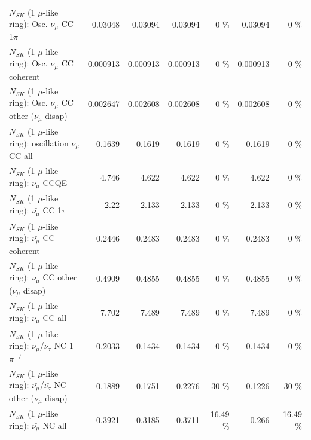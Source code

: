 \begin{table}
\begin{tabular}{| l | r | r | r  r | r  r |}
                          $N_{SK}$ (1 $\mu$-like ring): Osc. $\nu_\mu$ CC 1$\pi$ &         0.03048 &         0.03094 &         0.03094 &        0 \%  &         0.03094 &        0 \%  \\ 
                        $N_{SK}$ (1 $\mu$-like ring): Osc. $\nu_\mu$ CC coherent &        0.000913 &        0.000913 &        0.000913 &        0 \%  &        0.000913 &        0 \%  \\ 
         $N_{SK}$ (1 $\mu$-like ring): Osc. $\nu_\mu$ CC other ($\nu_\mu$ disap) &        0.002647 &        0.002608 &        0.002608 &        0 \%  &        0.002608 &        0 \%  \\ 
                      $N_{SK}$ (1 $\mu$-like ring): oscillation $\nu_\mu$ CC all &          0.1639 &          0.1619 &          0.1619 &        0 \%  &          0.1619 &        0 \%  \\ 
\hline
\hline
                              $N_{SK}$ (1 $\mu$-like ring): $\bar{\nu_\mu}$ CCQE &           4.746 &           4.622 &           4.622 &        0 \%  &           4.622 &        0 \%  \\ 
                         $N_{SK}$ (1 $\mu$-like ring): $\bar{\nu_\mu}$ CC 1$\pi$ &            2.22 &           2.133 &           2.133 &        0 \%  &           2.133 &        0 \%  \\ 
                       $N_{SK}$ (1 $\mu$-like ring): $\bar{\nu_\mu}$ CC coherent &          0.2446 &          0.2483 &          0.2483 &        0 \%  &          0.2483 &        0 \%  \\ 
        $N_{SK}$ (1 $\mu$-like ring): $\bar{\nu_\mu}$ CC other ($\nu_\mu$ disap) &          0.4909 &          0.4855 &          0.4855 &        0 \%  &          0.4855 &        0 \%  \\ 
                          $N_{SK}$ (1 $\mu$-like ring): $\bar{\nu_{\mu}}$ CC all &           7.702 &           7.489 &           7.489 &        0 \%  &           7.489 &        0 \%  \\ 
\hline
  $N_{SK}$ (1 $\mu$-like ring): $\bar{\nu_\mu}$/$\bar{\nu_\tau}$ NC 1$\pi^{+/-}$ &          0.2033 &          0.1434 &          0.1434 &        0 \%  &          0.1434 &        0 \%  \\ 
$N_{SK}$ (1 $\mu$-like ring): $\bar{\nu_\mu}$/$\bar{\nu_\tau}$ NC other ($\nu_\mu$ disap) &          0.1889 &          0.1751 &          0.2276 &       30 \%  &          0.1226 &      -30 \%  \\ 
                          $N_{SK}$ (1 $\mu$-like ring): $\bar{\nu_{\mu}}$ NC all &          0.3921 &          0.3185 &          0.3711 &    16.49 \%  &           0.266 &   -16.49 \%  \\ 

\end{tabular}
\end{table}
